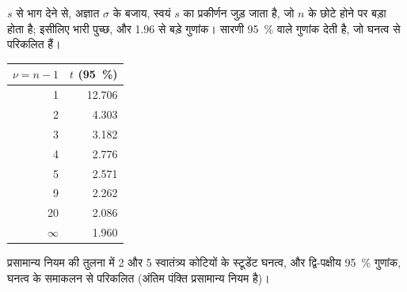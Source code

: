 \admitted

$s$ से भाग देने से, अज्ञात $\sigma$ के बजाय, स्वयं $s$ का प्रकीर्णन जुड़ जाता है, जो $n$ के
छोटे होने पर बड़ा होता है; इसीलिए भारी पुच्छ, और 1.96 से बड़े गुणांक। सारणी 95~\% वाले
गुणांक देती है, जो घनत्व से परिकलित हैं।

\begin{omfigure}
\begin{minipage}[c]{0.56\linewidth}
\end{minipage}\hfill
\begin{minipage}[c]{0.4\linewidth}\centering
\small
\begin{tabular}{rr}
\hline
$\nu = n - 1$ & $t$ (95~\%) \\
\hline
1 & 12.706 \\
2 & 4.303 \\
3 & 3.182 \\
4 & 2.776 \\
5 & 2.571 \\
9 & 2.262 \\
20 & 2.086 \\
$\infty$ & 1.960 \\
\hline
\end{tabular}
\end{minipage}
\par\vspace{4pt}

{\small प्रसामान्य नियम की तुलना में 2 और 5 स्वातंत्र्य कोटियों के स्टूडेंट घनत्व, और द्वि-पक्षीय
95~\% गुणांक, घनत्व के समाकलन से परिकलित (अंतिम पंक्ति प्रसामान्य नियम है)।}
\end{omfigure}

